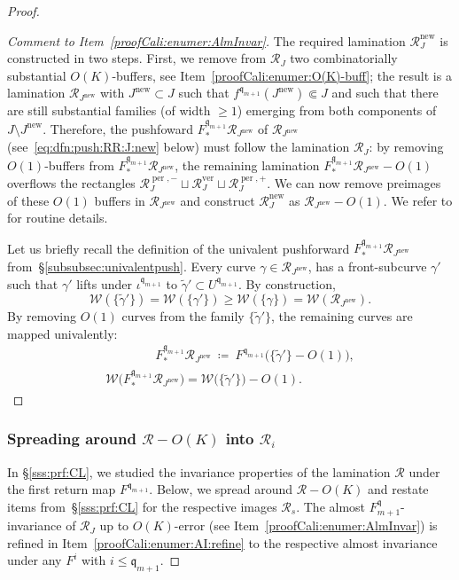 \documentclass{amsart}
\newcommand{\1}{{\mathbb 1 }}
\newcommand{\Width}{{\mathcal W}}
\newcommand\RR{\mathcal{R}}
\newcommand{\qq}{\mathfrak{q}}
\newcommand\new{{\operatorname{new}}}
\newcommand\ver{{\operatorname{ver}}}
\newcommand\per{{\operatorname{per}}}
\theoremstyle{remark}
\numberwithin{equation}{section}
\theoremstyle{definition}
\begin{document}
\begin{proof}
\begin{proof}[Comment to Item~\ref{proofCali:enumer:AlmInvar}] The required lamination $\RR^\new_J$ is constructed in two steps. First, we remove from $\RR_J$ two combinatorially substantial $O(K)$-buffers, see Item~\ref{proofCali:enumer:O(K)-buff}; the result is a lamination $\RR_{J^\new}$ with $J^\new\subset J$ such that $f^{\qq_{m+1}}(J^\new)\Subset J$ and such that there are still substantial families (of width $\ge 1$) emerging from both components of $J\setminus J^\new$. Therefore, the pushfoward $F^{\qq_{m+1}}_* \RR_{J^\new}$ of $\RR_{J^\new}$ (see~\eqref{eq:dfn:push:RR:J:new} below) must follow the lamination $\RR_J$: by removing $O(1)$-buffers from $F^{\qq_{m+1}}_* \RR_{J^\new}$, the remaining lamination $F^{\qq_{m+1}}_* \RR_{J^\new}-O(1)$ overflows the rectangles $\RR_J^{\per,-}\sqcup \RR_J^\ver\sqcup \RR_J^{\per,+}$. We can now remove preimages of these $O(1)$ buffers in $\RR_{J^\new}$ and construct $\RR_J^\new$ as $\RR_{J^\new}-O(1)$. We refer to \cite[Claim 3 in \S~9]{DL22} for routine details.

Let us briefly recall the definition of the univalent pushforward $F^{\qq_{m+1}}_* \RR_{J^\new}$ from~\S\ref{subsubsec:univalentpush}. Every curve $\gamma\in \RR_{J^\new}$, has a front-subcurve $\gamma'$ such that $\gamma'$ lifts under $\iota^{\qq_{m+1}}$ to $\tilde \gamma'\subset U^{\qq_{m+1}}$. By construction, 
\[\Width(\{\tilde \gamma'\})=\Width(\{\gamma'\})\ge \Width(\{\gamma\})=\Width(\RR_{J^\new}).\]
By removing $O(1)$ curves from the family $\{\tilde \gamma'\}$, the remaining curves are mapped univalently:
\begin{multline}
\label{eq:dfn:push:RR:J:new}\qquad\qquad
F^{\qq_{m+1}}_* \RR_{J^\new} \ \coloneqq \ F^{\qq_{m+1}}\big(\{\tilde \gamma'\} -O(1)\big), \\   \Width\Big(F^{\qq_{m+1}}_* \RR_{J^\new}\Big)=\Width\big(\{\tilde \gamma'\}\big)-O(1).\qquad\qquad
\end{multline}   
\end{proof}

\subsubsection{Spreading around $\RR-O(K)$ into $\RR_i$} In \S\ref{sss:prf:CL}, we studied the invariance properties of the lamination $\RR$ under the first return map $F^{\qq_{m+1}}$. Below, we spread around $\RR-O(K)$ and restate items from~\S\ref{sss:prf:CL} for the respective images $\RR_s$. The almost $F^\qq_{m+1}$-invariance of $\RR_J$ up to $O(K)$-error (see Item~\ref{proofCali:enumer:AlmInvar}) is refined in Item~\ref{proofCali:enumer:AI:refine} to the respective almost invariance under any $F^i$ with $i\le \qq_{m+1}$.



\end{proof}
\end{document}
